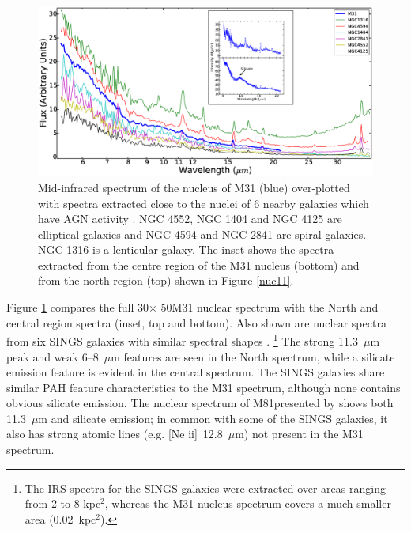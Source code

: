 \begin{figure}
\centering
\includegraphics[height = 8 cm]{./SINGSspec.eps}
\caption{Mid-infrared spectrum of the nucleus of M31 (blue) over-plotted with spectra extracted close to the nuclei of 6 nearby galaxies which have 
AGN activity \citep{Smith:2007lr}. NGC 4552, NGC 1404 and NGC 4125 are elliptical galaxies and NGC 4594 and NGC 2841 are spiral galaxies. 
NGC 1316 is a lenticular galaxy. The inset shows the spectra extracted from the centre region of the M31 nucleus (bottom) and from the north region (top) 
shown in Figure \ref{nuc11}.}
\label{smithspec}
\end{figure}

Figure \ref{smithspec} compares the full 30\arcsec $\times$ 50\arcsec M31 nuclear spectrum with
the North and central region spectra (inset, top and bottom). Also shown are nuclear spectra
from six SINGS galaxies with similar spectral shapes \citep{Smith:2007lr}.%
\footnote{The IRS spectra for the SINGS galaxies were extracted over areas ranging from 2 to 8 kpc$^2$, whereas the M31
nucleus spectrum covers a much smaller area (0.02~kpc$^2$).}
The strong 11.3~$\mu$m peak  and weak 6--8~$\mu$m features are  seen  in the
North spectrum, while a silicate emission feature is evident in the central spectrum.
The SINGS galaxies share similar PAH feature characteristics to the M31 spectrum, although none
contains obvious silicate emission. The nuclear spectrum of M81presented by \citet{Smith2010}
shows both 11.3~$\mu$m  and silicate emission; in common with some of the SINGS galaxies,
it also has strong atomic lines (e.g. [Ne {\sc ii}]~12.8~$\mu$m) not present in the M31 spectrum.


